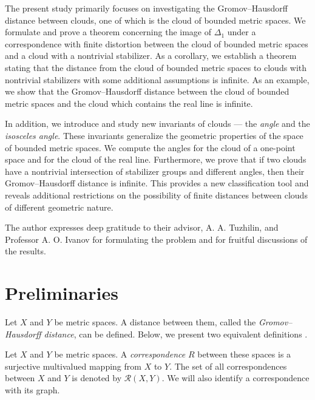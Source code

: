 The present study primarily focuses on investigating the
Gromov--Hausdorff distance between clouds, one of which is the cloud
of bounded metric spaces. We formulate and prove a theorem concerning
the image of $\Delta_1$ under a correspondence with finite distortion
between the cloud of bounded metric spaces and a cloud with a
nontrivial stabilizer. As a corollary, we establish a theorem stating
that the distance from the cloud of bounded metric spaces to clouds
with nontrivial stabilizers with some additional assumptions is
infinite. As an example, we show that the Gromov--Hausdorff distance
between the cloud of bounded metric spaces and the cloud which
contains the real line is infinite.

In addition, we introduce and study new invariants of clouds --- the
\emph{angle} and the \emph{isosceles angle}. These invariants
generalize the geometric properties of the space of bounded metric
spaces. We compute the angles for the cloud of a one-point space and
for the cloud of the real line. Furthermore, we prove that if two
clouds have a nontrivial intersection of stabilizer groups and
different angles, then their Gromov--Hausdorff distance is infinite.
This provides a new classification tool and reveals additional
restrictions on the possibility of finite distances between clouds of
different geometric nature.

The author expresses deep gratitude to their advisor, A. A. Tuzhilin,
and Professor A. O. Ivanov for formulating the problem and for
fruitful discussions of the results.

\section{Preliminaries}

Let $ X $ and $ Y $ be metric spaces. A distance between them, called
the \emph{Gromov--Hausdorff distance}, can be defined. Below, we
present two equivalent definitions \cite{Lectures}.

\begin{definition}
  Let $ X $ and $ Y $ be metric spaces. A \emph{correspondence} $ R $
  between these spaces is a surjective multivalued mapping from $ X $
  to $ Y $. The set of all correspondences between $ X $ and $ Y $ is
  denoted by $ \mathcal{R}(X,Y) $. We will also identify a
  correspondence with its graph.
\end{definition}

